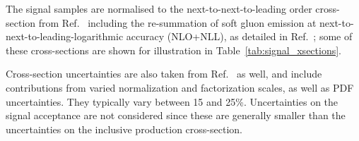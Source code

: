 The signal samples are normalised to the next-to-next-to-leading order cross-section from Ref.~\cite{twiki-SusyCrossSections} 
including the re-summation of soft gluon emission at next-to-next-to-leading-logarithmic accuracy (NLO+NLL), 
as detailed in Ref.~\cite{Borschensky:2014cia}; 
some of these cross-sections are shown for illustration in Table~\ref{tab:signal_xsections}. 

Cross-section uncertainties are also taken from Ref.~\cite{twiki-SusyCrossSections} as well, 
and include contributions from varied normalization and factorization scales, as well as PDF uncertainties. 
They typically vary between 15 and 25\%. 
Uncertainties on the signal acceptance are not considered since 
 these are generally smaller than the uncertainties on the inclusive production cross-section. 

